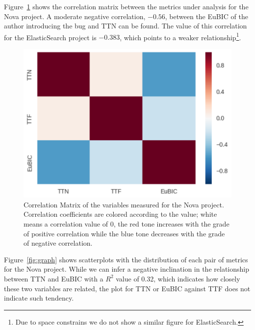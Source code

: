 \documentclass[10pt, conference]{IEEEtran}
\begin{document}
Figure~\ref{fig:correlation} shows the correlation matrix between the metrics under analysis for the Nova project. A moderate negative correlation, $-0.56$, between the EuBIC of the author introducing the bug and TTN can be found. The value of this correlation for the ElasticSearch project is $-0.383$, which points to a weaker relationship\footnote{Due to space constrains we do not show a similar figure for ElasticSearch.}.

\begin{figure}[ht]
\centering
\includegraphics[width=\columnwidth]{correlationMatrix.png}
\caption{Correlation Matrix of the variables measured for the Nova project. Correlation coefficients are colored according to the value; white means a correlation value of 0, the red tone increases with the grade of positive correlation while the blue tone decreases with the grade of negative correlation.}
\label{fig:correlation}       %
\end{figure}

Figure~\ref{fig:graph} shows scatterplots with the distribution of each pair of metrics for the Nova project. While we can infer a negative inclination in the relationship between TTN and EuBIC with a $R^2$ value of 0.32, which indicates how closely these two variables are related, the plot for TTN or EuBIC against TTF does not indicate such tendency. 
\end{document}
